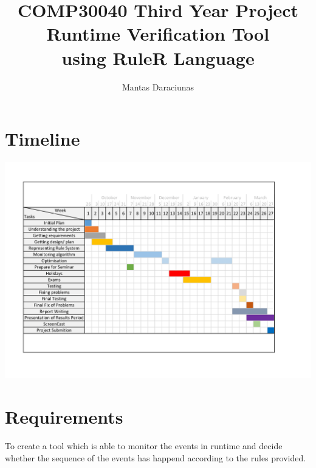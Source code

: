 \documentclass[a4paper]{article}
\begin{document}
\title{
\large COMP30040 Third Year Project
\\[0.7cm]
\textbf{\huge Runtime Verification Tool\\ using RuleR Language} 
}

\author{\Large Mantas Daraciunas} 
\date{}

\maketitle
\thispagestyle{firststyle} %
\newpage %

\tableofcontents
\pagestyle{rest}
\newpage
\section{Timeline}

\includegraphics[width=\textwidth,height=\textheight,keepaspectratio]{../Pictures/timeline.png}

\newpage
\section{Requirements}

To create a tool which is able to monitor the events in runtime and decide whether the sequence of the events has happend according to the rules provided. 
\end{document}
